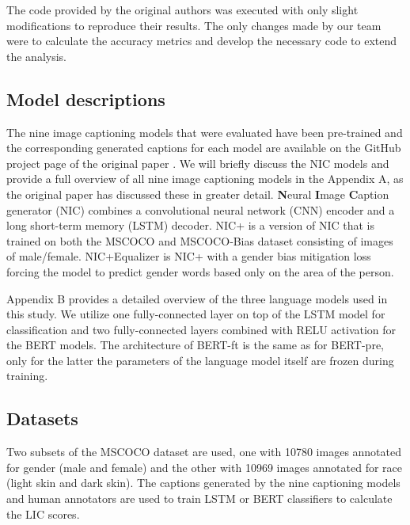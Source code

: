 The code provided by the original authors was executed with only slight modifications to reproduce their results. The only changes made by our team were to calculate the accuracy metrics and develop the necessary code to extend the analysis.

\subsection{Model descriptions}

\begin{comment}
Include a description of each model or algorithm used. Be sure to list the type of model, the number of parameters, and other relevant info (e.g. if it's pretrained). \newline
\end{comment}

The nine image captioning models that were evaluated have been pre-trained and the corresponding generated captions for each model are available on the GitHub project page of the original paper \cite{githubhirota}. We will briefly discuss the NIC models and provide a full overview of all nine image captioning models in the Appendix A, as the original paper has discussed these in greater detail. 
\textbf{N}eural \textbf{I}mage \textbf{C}aption generator (NIC) \cite{NIC:2015} combines a convolutional neural network (CNN) \cite{lecun2015deep} encoder and a long short-term memory (LSTM) \cite{6795963} decoder. NIC+ is a version of NIC that is trained on both the MSCOCO and MSCOCO‐Bias dataset consisting of images of male/female. NIC+Equalizer is NIC+ with a gender bias mitigation loss forcing the model to predict gender words based only on the area of the person. \newline

Appendix B provides a detailed overview of the three language models used in this study. We utilize one fully-connected layer on top of the LSTM model for classification and two fully-connected layers combined with RELU activation for the BERT \cite{bertpaper} models. The architecture of BERT-ft is the same as for BERT-pre, only for the latter the parameters of the language model itself are frozen during training.

\subsection{Datasets}

Two subsets of the MSCOCO dataset are used, one with 10780 images annotated for gender (male and female) and the other with 10969 images annotated for race (light skin and dark skin). The captions generated by the nine captioning models and human annotators are used to train LSTM or BERT classifiers to calculate the LIC scores. \newline 

